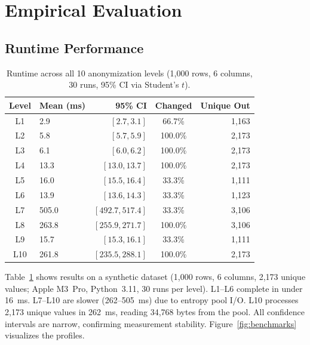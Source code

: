 \documentclass[acmsmall,screen,review,anonymous]{acmart}
\begin{document}
\section{Empirical Evaluation}
\label{sec:evaluation}

\subsection{Runtime Performance}

\begin{table}[t]
\caption{Runtime across all 10 anonymization levels (1,000 rows, 6 columns, 30 runs, 95\% CI via Student's $t$).}
\label{tab:benchmarks}
\begin{center}
\begin{tabular}{@{}clrcr@{}}
\toprule
\textbf{Level} & \textbf{Mean (ms)} & \textbf{95\% CI} & \textbf{Changed} & \textbf{Unique Out} \\
\midrule
L1  &    2.9 & $[2.7, 3.1]$ &  66.7\% & 1,163 \\
L2  &    5.8 & $[5.7, 5.9]$ & 100.0\% & 2,173 \\
L3  &    6.1 & $[6.0, 6.2]$ & 100.0\% & 2,173 \\
L4  &   13.3 & $[13.0, 13.7]$ & 100.0\% & 2,173 \\
L5  &   16.0 & $[15.5, 16.4]$ &  33.3\% & 1,111 \\
L6  &   13.9 & $[13.6, 14.3]$ &  33.3\% & 1,123 \\
L7  &  505.0 & $[492.7, 517.4]$ &  33.3\% & 3,106 \\
L8  &  263.8 & $[255.9, 271.7]$ & 100.0\% & 3,106 \\
L9  &   15.7 & $[15.3, 16.1]$ &  33.3\% & 1,111 \\
L10 &  261.8 & $[235.5, 288.1]$ & 100.0\% & 2,173 \\
\bottomrule
\end{tabular}
\end{center}
\end{table}

Table~\ref{tab:benchmarks} shows results on a synthetic dataset (1,000 rows, 6 columns, 2,173 unique values; Apple M3~Pro, Python~3.11, 30 runs per level). L1--L6 complete in under 16~ms. L7--L10 are slower (262--505~ms) due to entropy pool I/O. L10 processes 2,173 unique values in 262~ms, reading 34,768 bytes from the pool. All confidence intervals are narrow, confirming measurement stability. Figure~\ref{fig:benchmarks} visualizes the profiles.
\end{document}
